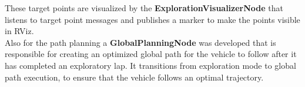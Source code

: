 These target points are visualized by the \textbf{ExplorationVisualizerNode} that listens to target point messages and publishes a marker to make the points visible in RViz.\\
\newline
Also for the path planning a \textbf{GlobalPlanningNode} was developed that is responsible for creating an optimized global path for the vehicle to follow after it has completed an exploratory lap. It transitions from exploration mode to global path execution, to ensure that the vehicle follows an optimal trajectory.